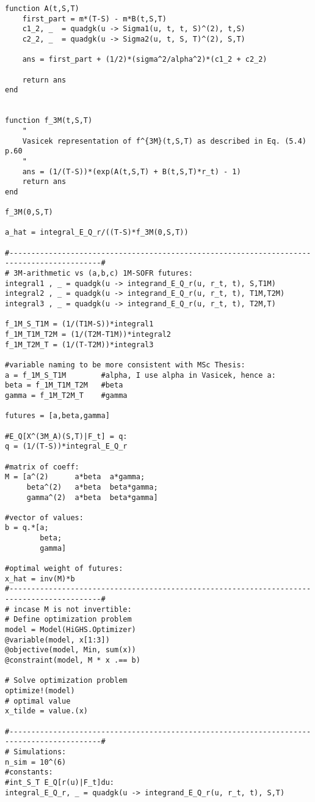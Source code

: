 \begin{verbatim}
function A(t,S,T)
    first_part = m*(T-S) - m*B(t,S,T)
    c1_2, _  = quadgk(u -> Sigma1(u, t, t, S)^(2), t,S) 
    c2_2, _  = quadgk(u -> Sigma2(u, t, S, T)^(2), S,T)

    ans = first_part + (1/2)*(sigma^2/alpha^2)*(c1_2 + c2_2)

    return ans
end


function f_3M(t,S,T)
    " 
    Vasicek representation of f^{3M}(t,S,T) as described in Eq. (5.4) p.60
    "
    ans = (1/(T-S))*(exp(A(t,S,T) + B(t,S,T)*r_t) - 1)
    return ans
end

f_3M(0,S,T)

a_hat = integral_E_Q_r/((T-S)*f_3M(0,S,T))

#-------------------------------------------------------------------------------------------#
# 3M-arithmetic vs (a,b,c) 1M-SOFR futures: 
integral1 , _ = quadgk(u -> integrand_E_Q_r(u, r_t, t), S,T1M)
integral2 , _ = quadgk(u -> integrand_E_Q_r(u, r_t, t), T1M,T2M)
integral3 , _ = quadgk(u -> integrand_E_Q_r(u, r_t, t), T2M,T)

f_1M_S_T1M = (1/(T1M-S))*integral1
f_1M_T1M_T2M = (1/(T2M-T1M))*integral2
f_1M_T2M_T = (1/(T-T2M))*integral3

#variable naming to be more consistent with MSc Thesis:
a = f_1M_S_T1M        #alpha, I use alpha in Vasicek, hence a: 
beta = f_1M_T1M_T2M   #beta
gamma = f_1M_T2M_T    #gamma

futures = [a,beta,gamma]

#E_Q[X^(3M_A)(S,T)|F_t] = q: 
q = (1/(T-S))*integral_E_Q_r 

#matrix of coeff: 
M = [a^(2)      a*beta  a*gamma;
     beta^(2)   a*beta  beta*gamma; 
     gamma^(2)  a*beta  beta*gamma] 
     
#vector of values: 
b = q.*[a;
        beta;
        gamma] 

#optimal weight of futures:
x_hat = inv(M)*b 
#-------------------------------------------------------------------------------------------#
# incase M is not invertible: 
# Define optimization problem
model = Model(HiGHS.Optimizer)
@variable(model, x[1:3])
@objective(model, Min, sum(x))
@constraint(model, M * x .== b)

# Solve optimization problem
optimize!(model)
# optimal value
x_tilde = value.(x)

#-------------------------------------------------------------------------------------------#
# Simulations: 
n_sim = 10^(6)
#constants: 
#int_S_T E_Q[r(u)|F_t]du:
integral_E_Q_r, _ = quadgk(u -> integrand_E_Q_r(u, r_t, t), S,T)


\end{verbatim}
